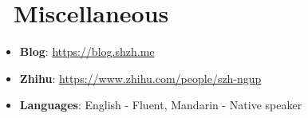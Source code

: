 \documentclass{cv}
\begin{document}
\section{\faInfo\ Miscellaneous}
\begin{itemize}[parsep=0.5ex]
  \item \textbf{Blog}: \href{https://blog.shzh.me}{https://blog.shzh.me}
  \item \textbf{Zhihu}: \href{https://www.zhihu.com/people/szh-ngup}{https://www.zhihu.com/people/szh-ngup}
  \item \textbf{Languages}: English - Fluent, Mandarin - Native speaker
\end{itemize}
\end{document}
